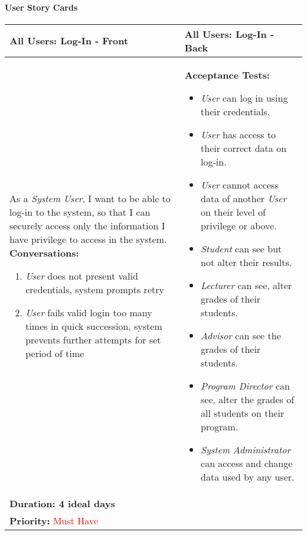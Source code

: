 \documentclass[11pt]{article}
\begin{document}
\paragraph*{User Story Cards}
\begin{center}
\begin{tabular}{ | m{8cm}  |  m{8cm}  | } 
 \hline
 \textbf{All Users: Log-In  - Front} &  \textbf{All Users: Log-In - Back}  \\ 
  \hline
As a \emph{System User}, I want to be able to log-in to the system, so that I can securely access only the information I have privilege to access in the system.
\newline
\textbf{Conversations:}
\begin{enumerate}
\item{\emph{User} does not present valid credentials, system prompts retry}
\item{\emph{User} fails valid login too many times in quick succession, system prevents further attempts for set period of time} 
\end{enumerate}
& \textbf{Acceptance Tests:} 
\begin{itemize}
\item{\emph{User} can log in using their credentials.}
\item{\emph{User} has access to their correct data on log-in.}
\item{\emph{User} cannot access data of another \emph{User} on their level of privilege or above.}
\item{\emph{Student} can see but not alter their results.}
\item{\emph{Lecturer} can see, alter grades of their students.}
\item{\emph{Advisor} can see the grades of their students.}
\item{\emph{Program Director} can see, alter the grades of all students on their program.}
\item{\emph{System Administrator} can access and change data used by any user.}
\end{itemize} \\
\textbf{Duration: 4 ideal days} &\\
\textbf{Priority:}  \textcolor{red}{Must Have} & \\
 \hline
\end{tabular}
\end{center}
\end{document}
